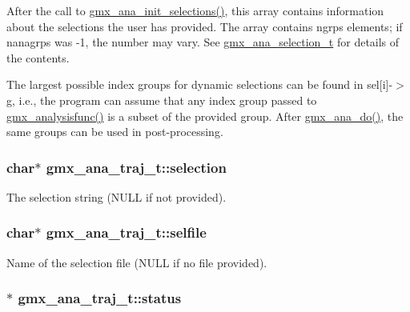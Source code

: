 \-After the call to \hyperlink{include_2trajana_8h_a25e689bd718e61d642d199a935262edd}{gmx\-\_\-ana\-\_\-init\-\_\-selections()}, this array contains information about the selections the user has provided. \-The array contains {\ttfamily ngrps} elements; if {\ttfamily nanagrps} was -\/1, the number may vary. \-See {\ttfamily \hyperlink{structgmx__ana__selection__t}{gmx\-\_\-ana\-\_\-selection\-\_\-t}} for details of the contents.

\-The largest possible index groups for dynamic selections can be found in {\ttfamily sel}\mbox{[}i\mbox{]}-\/$>$g, i.\-e., the program can assume that any index group passed to \hyperlink{include_2trajana_8h_ae359015d9f5e49a31d5f4fd113bf7a3d}{gmx\-\_\-analysisfunc()} is a subset of the provided group. \-After \hyperlink{include_2trajana_8h_ad15724eb62ef6be23dd5e7d2d93c8f15}{gmx\-\_\-ana\-\_\-do()}, the same groups can be used in post-\/processing. \hypertarget{structgmx__ana__traj__t_ae4f480a1a1c54b77ebbc86aed0a2d691}{
\subsubsection[{selection}]{\setlength{\rightskip}{0pt plus 5cm}char$\ast$ {\bf gmx\-\_\-ana\-\_\-traj\-\_\-t\-::selection}}}\label{structgmx__ana__traj__t_ae4f480a1a1c54b77ebbc86aed0a2d691}
\-The selection string (\-N\-U\-L\-L if not provided). \hypertarget{structgmx__ana__traj__t_a81197af632ea1ab077460a3120cffb5b}{
\subsubsection[{selfile}]{\setlength{\rightskip}{0pt plus 5cm}char$\ast$ {\bf gmx\-\_\-ana\-\_\-traj\-\_\-t\-::selfile}}}\label{structgmx__ana__traj__t_a81197af632ea1ab077460a3120cffb5b}
\-Name of the selection file (\-N\-U\-L\-L if no file provided). \hypertarget{structgmx__ana__traj__t_a00ea8b2f332679818d015c0934ef7aeb}{
\subsubsection[{status}]{$\ast$ {\bf gmx\-\_\-ana\-\_\-traj\-\_\-t\-::status}}}\label{structgmx__ana__traj__t_a00ea8b2f332679818d015c0934ef7aeb}
